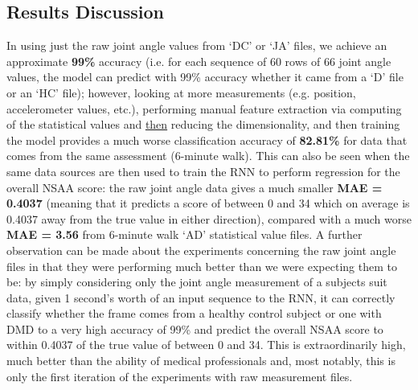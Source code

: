 \documentclass[12pt,twoside]{report}
\begin{document}
\subsection{Results Discussion}

\quad In using just the raw joint angle values from ‘DC’ or ‘JA’ files, we achieve an approximate \textbf{99\%} accuracy (i.e. for each sequence of 60 rows of 66 joint angle values, the model can predict with 99\% accuracy whether it came from a ‘D’ file or an ‘HC’ file); however, looking at more measurements (e.g. position, accelerometer values, etc.), performing manual feature extraction via computing of the statistical values and \underline{then} reducing the dimensionality, and then training the model provides a much worse classification accuracy of \textbf{82.81\%} for data that comes from the same assessment (6-minute walk). This can also be seen when the same data sources are then used to train the RNN to perform regression for the overall NSAA score: the raw joint angle data gives a much smaller \textbf{MAE = 0.4037} (meaning that it predicts a score of between 0 and 34 which on average is 0.4037 away from the true value in either direction), compared with a much worse \textbf{MAE = 3.56} from 6-minute walk ‘AD’ statistical value files. A further observation can be made about the experiments concerning the raw joint angle files in that they were performing much better than we were expecting them to be: by simply considering only the joint angle measurement of a subjects suit data, given 1 second’s worth of an input sequence to the RNN, it can correctly classify whether the frame comes from a healthy control subject or one with DMD to a very high accuracy of 99\% and predict the overall NSAA score to within 0.4037 of the true value of between 0 and 34. This is extraordinarily high, much better than the ability of medical professionals and, most notably, this is only the first iteration of the experiments with raw measurement files.\\
\end{document}
